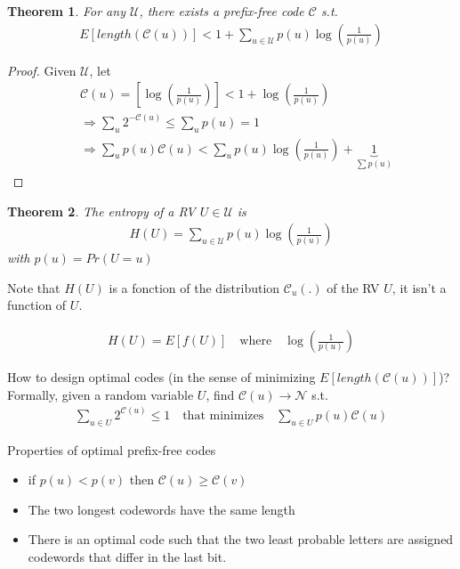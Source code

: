 \documentclass{article}
\newtheorem{theorem}{Theorem}[section]
\def\U{\mathcal{U}}
\def\N{\mathcal{N}}
\def\C{\mathcal{C}}
\begin{document}
\begin{theorem}
  For any $\U$, there exists a prefix-free code $\C$ s.t.
  \begin{align*}
    E[length(\C(u))] < 1 + \sum_{u \in \U} p(u) \log(\frac{1}{p(u)})
  \end{align*}
\end{theorem}
\begin{proof}
  Given $\U$, let 
  \begin{align*}
    &\C(u) = [\log(\frac{1}{p(u)})] < 1 + \log(\frac{1}{p(u)}) \\
    &\Rightarrow \sum_u 2^{-\C(u)} \leq \sum_u p(u) = 1 \\
    &\Rightarrow \sum_u p(u) \C(u) < \sum_u p(u) \log(\frac{1}{p(u)}) + \underbrace{1}_{\sum p(u)}
  \end{align*}
\end{proof}

\begin{theorem}
  The entropy of a RV $U \in \U$ is 
  \begin{align*}
    H(U) = \sum_{u \in \U} p(u) \log(\frac{1}{p(u)})
  \end{align*}
  with $p(u) = Pr(U = u)$
\end{theorem}
Note that $H(U)$ is a fonction of the distribution $\C_u(.)$ of the RV $U$, it isn't a function of $U$.

\begin{align*}
  H(U) = E[f(U)] \quad \text{where} \quad \log(\frac{1}{p(u)})
\end{align*}

How to design optimal codes (in the sense of minimizing $E[length(\C(u))]$)? \\
Formally, given a random variable $U$, find $\C(u) \rightarrow \N$ s.t.
\begin{align*}
  \sum_{u \in U} 2^{\C(u)} \leq 1 
\quad \text{that minimizes} \quad
  \sum_{u \in U} p(u)\C(u)
\end{align*}

Properties of optimal prefix-free codes
\begin{itemize}
  \item if $p(u) < p(v)$ then $\C(u) \geq \C(v)$
  \item The two longest codewords have the same length
  \item There is an optimal code such that the two least probable letters are assigned codewords that differ in the last bit.
\end{itemize}
\end{document}
